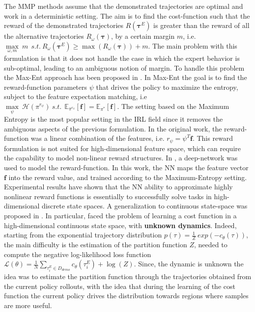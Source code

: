 The MMP methods assume that the demonstrated trajectories are optimal and work in a deterministic setting. The aim is to find the cost-function such that the reward of the demonstrated trajectories $R(\boldsymbol{\tau}^{E})$ is greater than the reward of all the alternative trajectories $R_{\omega}(\boldsymbol{\tau})$, by a certain margin $m$, i.e. $ \underset{\omega, m}{\max} \ m \  \ s.t. \ R_{\omega}(\boldsymbol{\tau}^{E}) \geq \max (R_{\omega}(\boldsymbol{\tau})) + m$. The main problem with this formulation is that it does not handle the case in which the expert behavior is sub-optimal, leading to an ambiguous notion of margin. To handle this problem the Max-Ent approach has been proposed in \cite{ziebart2008maximum_entropy}. In Max-Ent the goal is to find the reward-function parameters $\psi$ that drives the policy to maximize the entropy, subject to the feature expectation matching, i.e $\underset{\psi}{\max} \ \mathcal{H}(\pi^{r_{\psi}}) \ s.t. \ \ \mathbb{E}_{\pi^{r_{\psi}}}[\mathbf{f}] = \mathbb{E}_{\pi^{*}}[\mathbf{f}]$. The setting based on the Maximum Entropy is the most popular setting in the IRL field since it removes the ambiguous aspects of the previous formulation. In the original work, the reward-function was a linear combination of the features, i.e. $r_{\psi} = \psi^T \mathbf{f}$. This reward formulation is not suited for high-dimensional feature space, which can require the capability to model non-linear reward structures. In \cite{wulfmeier2015deep_inverse_rl}, a deep-network was used to model the reward-function. In this work, the NN maps the feature vector $\textbf{f}$ into the reward value, and trained according to the Maximum-Entropy setting. Experimental results have shown that the NN ability to approximate highly nonlinear reward functions is essentially to successfully solve tasks in high-dimensional discrete state spaces. A generalization to continuous state-space was proposed in \cite{finn2016guided_cost_learning}. In particular, \cite{finn2016guided_cost_learning} faced the problem of learning a cost function in a high-dimensional continuous state space, with \textbf{unknown dynamics}. Indeed, starting from the exponential trajectory distribution $p(\tau) = \frac{1}{Z} \ exp(-c_{\theta}(\tau))$, the main difficulty is the estimation of the partition function $Z$, needed to compute the negative log-likelihood loss function $\mathcal{L}(\theta) = \frac{1}{N} \underset{\tau^{E}_{i} \in D_{demo}}{\sum} c_{\theta}(\tau^{E}_{i}) + \log(Z)$. Since, the dynamic is unknown the idea was to estimate the partition function through the trajectories obtained from the current policy rollouts, with the idea that during the learning of the cost function the current policy drives the distribution towards regions where samples are more useful.%
